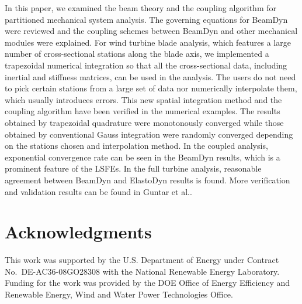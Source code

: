 \documentclass{aiaa-tc}
\begin{document}
In this paper, we examined the beam theory and the coupling algorithm for partitioned mechanical system analysis. The governing equations for BeamDyn were reviewed and the coupling schemes between BeamDyn and other mechanical modules were explained. For wind turbine blade analysis, which features a large number of cross-sectional stations along the blade axis, we implemented a trapezoidal numerical integration so that all the cross-sectional data, including inertial and stiffness matrices, can be used in the analysis. The users do not need to pick certain stations from a large set of data nor numerically interpolate them, which usually introduces errors. This new spatial integration method and the coupling algorithm have been verified in the numerical examples. The results obtained by trapezoidal quadrature were monotonously converged while those obtained by conventional Gauss integration were randomly converged depending on the stations chosen and interpolation method. In the coupled analysis, exponential convergence rate can be seen in the BeamDyn results, which is a prominent feature of the LSFEs. In the full turbine analysis, reasonable agreement between BeamDyn and ElastoDyn results is found. More verification and validation results can be found in Guntar et al.\cite{Sri:SciTech2016}.
  
\section*{Acknowledgments} 

This work was supported by the U.S. Department of Energy under Contract No.\
DE-AC36-08GO28308 with the National Renewable Energy Laboratory. Funding for the work was provided by the DOE Office of Energy Efficiency and Renewable Energy, Wind and Water Power Technologies Office.   



\end{document}

